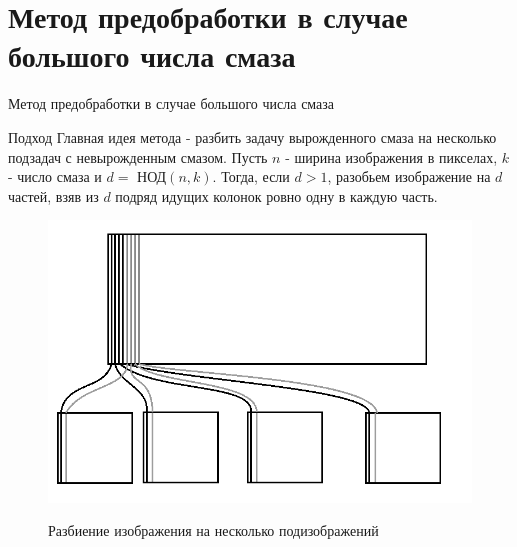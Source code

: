 \documentclass[10pt]{beamer}
\begin{document}
\section[Метод разбиения]{Метод предобработки в случае большого числа смаза}
\begin{frame}{Метод предобработки в случае большого числа смаза}
\begin{block}{Подход}
Главная идея метода - разбить задачу вырожденного смаза на несколько подзадач с невырожденным смазом.
Пусть $n$ - ширина изображения в пикселах, $k$ - число смаза и $d =$ НОД$(n, k)$. Тогда, если $d > 1$, разобьем изображение на $d$ частей, взяв из $d$ подряд идущих колонок ровно одну в каждую часть.
\end{block}

\begin{block}{}
 \begin{figure}[H]
            \includegraphics[scale=0.2]{fig1.png}
            \label{Pic1}
            \caption[Разбиение изображения на несколько подизображений]{Разбиение изображения на несколько подизображений}
        \end{figure}
\end{block}

\end{frame}
\end{document}

